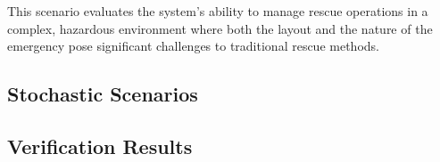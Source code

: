 This scenario evaluates the system's ability to manage rescue operations in a complex, hazardous environment where both the layout and the nature of the emergency pose significant challenges to traditional rescue methods.
\subsection{Stochastic Scenarios}

\subsection{Verification Results}